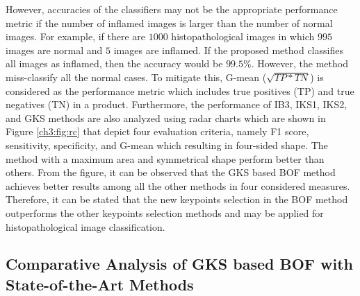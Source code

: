However, accuracies of the classifiers may not be the appropriate performance metric if the number of inflamed images is larger than the number of normal images. For example, if there are $1000$ histopathological images in which $995$ images are normal and $5$ images are inflamed. If the proposed method classifies all images as inflamed, then the accuracy would be $99.5\%$. However, the method miss-classify  all the normal cases. To mitigate this, G-mean ($\sqrt{TP*TN}$) is considered as the performance metric which includes true positives (TP) and true negatives (TN) in a product. Furthermore, the performance of IB3, IKS1, IKS2, and GKS methods are also analyzed using radar charts which are shown in Figure \ref{ch3:fig:rc} that depict four evaluation criteria, namely F1 score, sensitivity, specificity, and G-mean which resulting in four-sided shape. The method with a maximum area and symmetrical shape perform better than others. From the figure, it can be observed that the GKS based BOF method achieves better results among all the other methods in four considered measures. Therefore, it can be stated that the new keypoints selection in the BOF method outperforms the other keypoints selection methods and may be applied for histopathological image classification.

\subsection{Comparative Analysis of GKS based BOF with State-of-the-Art Methods }\label{ch3:subsec:3}

